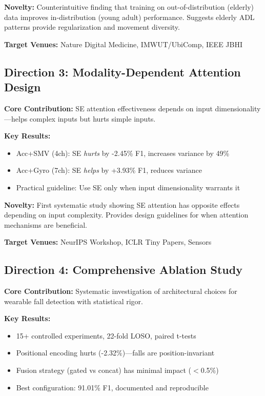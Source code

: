 \documentclass{article}
\begin{document}
\textbf{Novelty:} Counterintuitive finding that training on out-of-distribution (elderly) data improves in-distribution (young adult) performance. Suggests elderly ADL patterns provide regularization and movement diversity.

\textbf{Target Venues:} Nature Digital Medicine, IMWUT/UbiComp, IEEE JBHI

\subsection{Direction 3: Modality-Dependent Attention Design}

\textbf{Core Contribution:} SE attention effectiveness depends on input dimensionality---helps complex inputs but hurts simple inputs.

\textbf{Key Results:}
\begin{itemize}
    \item Acc+SMV (4ch): SE \textit{hurts} by -2.45\% F1, increases variance by 49\%
    \item Acc+Gyro (7ch): SE \textit{helps} by +3.93\% F1, reduces variance
    \item Practical guideline: Use SE only when input dimensionality warrants it
\end{itemize}

\textbf{Novelty:} First systematic study showing SE attention has opposite effects depending on input complexity. Provides design guidelines for when attention mechanisms are beneficial.

\textbf{Target Venues:} NeurIPS Workshop, ICLR Tiny Papers, Sensors

\subsection{Direction 4: Comprehensive Ablation Study}

\textbf{Core Contribution:} Systematic investigation of architectural choices for wearable fall detection with statistical rigor.

\textbf{Key Results:}
\begin{itemize}
    \item 15+ controlled experiments, 22-fold LOSO, paired t-tests
    \item Positional encoding hurts (-2.32\%)---falls are position-invariant
    \item Fusion strategy (gated vs concat) has minimal impact ($<$0.5\%)
    \item Best configuration: 91.01\% F1, documented and reproducible
\end{itemize}
\end{document}
